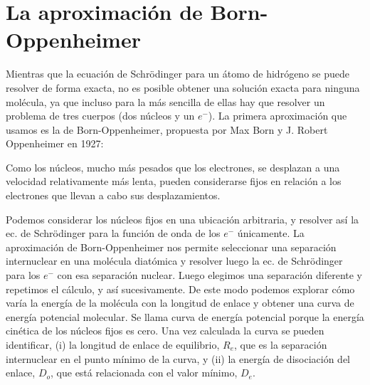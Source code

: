 \section{La aproximación de Born-Oppenheimer}
Mientras que la ecuación de Schrödinger para un átomo de hidrógeno
se puede resolver de forma exacta, no es posible obtener una solución
exacta para ninguna molécula, ya que incluso para la más sencilla de 
ellas hay que resolver un problema de tres cuerpos (dos núcleos y un
$e^{-}$). La primera aproximación que usamos es la de Born-Oppenheimer,
propuesta por Max Born y J. Robert Oppenheimer en 1927:
\begin{displayquote}
    Como los núcleos, mucho más pesados que los electrones, se desplazan
    a una velocidad relativamente más lenta, pueden considerarse fijos 
    en relación a los electrones que llevan a cabo sus desplazamientos.
\end{displayquote}
Podemos considerar los núcleos fijos en una ubicación arbitraria, y 
resolver así la ec. de Schrödinger para la función de onda de los $e^-$
únicamente. La aproximación de Born-Oppenheimer nos permite seleccionar 
una separación internuclear en una molécula diatómica y resolver luego 
la ec. de Schrödinger para los $e^-$ con esa separación nuclear.
Luego elegimos una separación diferente y repetimos el cálculo, y así
sucesivamente. De este modo podemos explorar cómo varía la energía de la
molécula con la longitud de enlace y obtener una curva de energía potencial 
molecular. Se llama curva de energía potencial porque la energía cinética
de los núcleos fijos es cero. Una vez calculada la curva se pueden
identificar, (i) la longitud de enlace de equilibrio, $R_e$, que es la 
separación internuclear en el punto mínimo de la curva, y (ii) la 
energía de disociación del enlace, $D_o$, que está relacionada con el 
valor mínimo, $D_e$.

